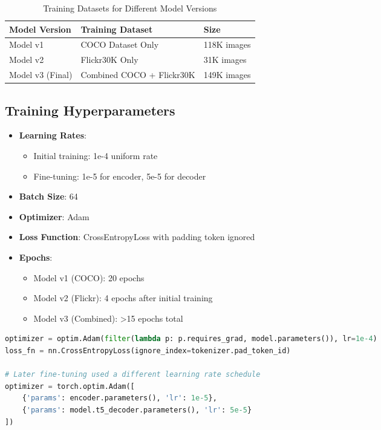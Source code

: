 \documentclass[12pt,a4paper]{report}
\begin{document}
\begin{table}[h]
\centering
\begin{tabular}{lll}
\toprule
\textbf{Model Version} & \textbf{Training Dataset} & \textbf{Size} \\
\midrule
Model v1 & COCO Dataset Only & 118K images \\
Model v2 & Flickr30K Only & 31K images \\
Model v3 (Final) & Combined COCO + Flickr30K & 149K images \\
\bottomrule
\end{tabular}
\caption{Training Datasets for Different Model Versions}
\label{tab:datasets}
\end{table}

\subsection{Training Hyperparameters}
\begin{itemize}
    \item \textbf{Learning Rates}: 
        \begin{itemize}
            \item Initial training: 1e-4 uniform rate
            \item Fine-tuning: 1e-5 for encoder, 5e-5 for decoder
        \end{itemize}
    \item \textbf{Batch Size}: 64
    \item \textbf{Optimizer}: Adam
    \item \textbf{Loss Function}: CrossEntropyLoss with padding token ignored
    \item \textbf{Epochs}: 
        \begin{itemize}
            \item Model v1 (COCO): 20 epochs
            \item Model v2 (Flickr): 4 epochs after initial training
            \item Model v3 (Combined): >15 epochs total
        \end{itemize}
\end{itemize}

\begin{lstlisting}[language=python, caption=Training Setup]
optimizer = optim.Adam(filter(lambda p: p.requires_grad, model.parameters()), lr=1e-4)
loss_fn = nn.CrossEntropyLoss(ignore_index=tokenizer.pad_token_id)

# Later fine-tuning used a different learning rate schedule
optimizer = torch.optim.Adam([
    {'params': encoder.parameters(), 'lr': 1e-5},
    {'params': model.t5_decoder.parameters(), 'lr': 5e-5}
])
\end{lstlisting}
\end{document}
